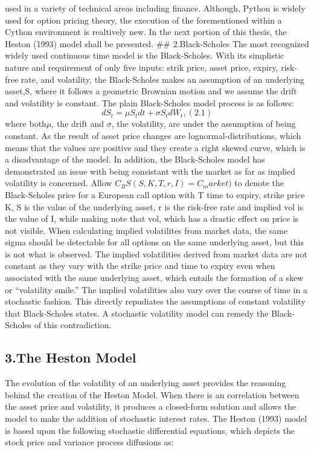 \documentclass[11pt,]{article}
\begin{document}
used in a variety of technical areas including finance. Although, Python
is widely used for option pricing theory, the execution of the
forementioned within a Cython environment is realtively new. In the next
portion of this thesis, the Heston (1993) model shall be presented. \#\#
2.Black-Scholes The most recognized widely used continuous time model is
the Black-Scholes. With its simplistic nature and requirement of only
five inputs: strik price, asset price, expiry, risk-free rate, and
volatility, the Black-Scholes makes an assumption of an underlying
asset,S, where it follows a geometric Brownian motion and we assume the
drift and volatility is constant. The plain Black-Scholes model process
is as follows: \[
dS_{t} = \mu S_{t} dt + \sigma S_{t} dW_t,                          (2.1)
\] where both\(\mu\), the drift and \(\sigma\), the volatility, are
under the assumption of being constant. As the result of asset price
changes are lognormal-distributions, which means that the values are
positive and they create a right skewed curve, which is a disadvantage
of the model. In addition, the Black-Scholes model has demonstrated an
issue with being consistant with the market as far as implied volatility
is concerned. Allow \(C_BS(S,K,T,r,I) = C_market)\) to denote the
Black-Scholes price for a European call option with T time to expiry,
strike price K, S is the value of the underlying asset, r is the
risk-free rate and implied vol is the value of I, while making note that
vol, which has a drastic effect on price is not visible. When
calculating implied volatilites from market data, the same sigma should
be detectable for all options on the same underlying asset, but this is
not what is observed. The implied volatilities derived from market data
are not constant as they vary with the strike price and time to expiry
even when associated with the same underlying asset, which entails the
formation of a skew or ``volatility smile.'' The implied volatilities
also vary over the course of time in a stochastic fashion. This directly
repudiates the assumptions of constant volatility that Black-Scholes
states. A stochastic volatility model can remedy the Black-Scholes of
this contradiction.

\subsection{3.The Heston Model}\label{the-heston-model}

The evolution of the volatility of an underlying asset provides the
reasoning behind the creation of the Heston Model. When there is an
correlation between the asset price and volatility, it produces a
closed-form solution and allows the model to make the addition of
stochastic interest rates. The Heston (1993) model is based upon the
following stochastic differential equations, which depicts the stock
price and variance process diffusions as:
\end{document}
